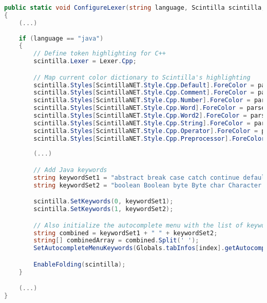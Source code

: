 \begin{lstlisting}[language=csharp, caption={The ConfigureLexer() method that is called whenever the user opens a new file or changes Pie's theme}]
public static void ConfigureLexer(string language, Scintilla scintilla, KryptonDockableNavigator tabControl, int index)
{
    (...)
    
    if (language == "java")
    {
        // Define token highlighting for C++
        scintilla.Lexer = Lexer.Cpp;

        // Map current color dictionary to Scintilla's highlighting
        scintilla.Styles[ScintillaNET.Style.Cpp.Default].ForeColor = parserColorDictionary["Default"];
        scintilla.Styles[ScintillaNET.Style.Cpp.Comment].ForeColor = parserColorDictionary["Comment"];
        scintilla.Styles[ScintillaNET.Style.Cpp.Number].ForeColor = parserColorDictionary["Number"];
        scintilla.Styles[ScintillaNET.Style.Cpp.Word].ForeColor = parserColorDictionary["Word"];
        scintilla.Styles[ScintillaNET.Style.Cpp.Word2].ForeColor = parserColorDictionary["Word2"];
        scintilla.Styles[ScintillaNET.Style.Cpp.String].ForeColor = parserColorDictionary["String"];
        scintilla.Styles[ScintillaNET.Style.Cpp.Operator].ForeColor = parserColorDictionary["Operator"];
        scintilla.Styles[ScintillaNET.Style.Cpp.Preprocessor].ForeColor = parserColorDictionary["Preprocessor"];
        
        (...)

        // Add Java keywords
        string keywordSet1 = "abstract break case catch continue default do else extern false finally for native super extends final native transient volatile implements synchronized if instanceof import package interface new null private protected public record return sizeof switch this throw throws true try while";
        string keywordSet2 = "boolean Boolean byte Byte char Character class double Double enum float Float int Integer long Long short Short static String void";

        scintilla.SetKeywords(0, keywordSet1);
        scintilla.SetKeywords(1, keywordSet2);

        // Also initialize the autocomplete menu with the list of keywords
        string combined = keywordSet1 + " " + keywordSet2;
        string[] combinedArray = combined.Split(' ');
        SetAutocompleteMenuKeywords(Globals.tabInfos[index].getAutocompleteMenu(), combinedArray.ToList());

        EnableFolding(scintilla);
    }

    (...)
}
\end{lstlisting}

